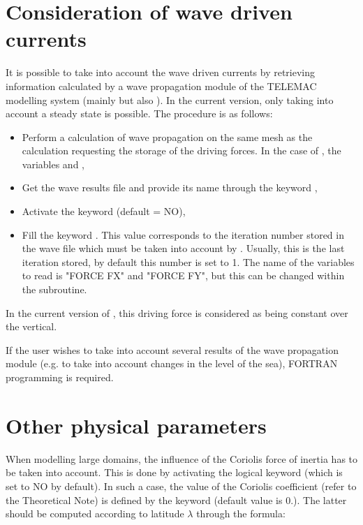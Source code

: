 \section{Consideration of wave driven currents}

It is possible to take into account the wave driven currents by retrieving
information calculated by a wave propagation module of the TELEMAC modelling
system (mainly \tomawac but also \artemis). In the current version,
only taking into account a steady state is possible. The procedure is as
follows:

\begin{itemize}
\item  Perform a calculation of wave propagation on the same mesh as the
 calculation requesting the storage of the driving forces. In the
case of \tomawac, the variables  and ,

\item  Get the wave results file and provide its name through the keyword
,

\item  Activate the keyword  (default = NO),

\item  Fill the keyword . This value
corresponds to the iteration number stored in the wave file which must be taken
into account by . Usually, this is the last iteration stored, by
default this number is set to 1. The name of the variables to read is "FORCE
FX" and "FORCE FY", but this can be changed within the  subroutine.
\end{itemize}

In the current version of , this driving force is considered as being
constant over the vertical.

If the user wishes to take into account several results of the wave propagation
module (e.g. to take into account changes in the level of the sea), FORTRAN
programming is required.

\section{Other physical parameters}

When modelling large domains, the influence of the Coriolis force of inertia
has to be taken into account. This is done by activating the logical keyword
 (which is set to NO by default). In such a case, the value of
the Coriolis coefficient (refer to the Theoretical Note) is defined by the
keyword  (default value is 0.). The latter should
be computed according to latitude $\lambda$ through the formula:

